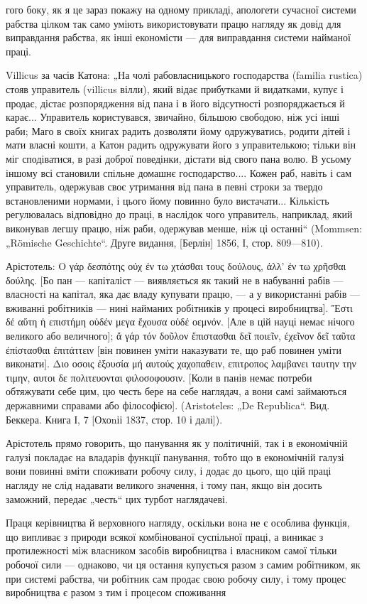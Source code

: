 гого боку, як я це зараз покажу на одному прикладі, апологети
сучасної системи рабства цілком так само уміють використовувати
працю нагляду як довід для виправдання рабства, як інші
економісти — для виправдання системи найманої праці.

Villicus за часів Катона: „На чолі рабовласницького господарства
(familia rustica) стояв управитель (villicus вілли), який відає
прибутками й видатками, купує і продає, дістає розпорядження
від пана і в його відсутності розпоряджається й карає...
Управитель користувався, звичайно, більшою свободою, ніж
усі інші раби; Маго в своїх книгах радить дозволяти йому одружуватись,
родити дітей і мати власні кошти, а Катон радить
одружувати його з управителькою; тільки він міг сподіватися,
в разі доброї поведінки, дістати від свого пана волю. В усьому
іншому всі становили спільне домашнє господарство.... Кожен
раб, навіть і сам управитель, одержував своє утримання від
пана в певні строки за твердо встановленими нормами, і цього
йому повинно було вистачати... Кількість регулювалась відповідно
до праці, в наслідок чого управитель, наприклад, який
виконував легшу працю, ніж раби, одержував менше, ніж ці
останні“ (Mommsen: „Römische Geschichte“. Друге видання, [Берлін]
1856, І, стор. 809—810).

Арістотель: Ο γάρ δεσπότης οὐχ ἐν τω  χτάσθαι τους δούλους, ἀλλ’ ἐν τω
χρῆσθαι δούλης. [Бо пан — капіталіст — виявляється як такий не в
набуванні рабів — власності на капітал, яка дає владу купувати
працю, — а у використанні рабів — вживанні робітників — нині
найманих робітників у процесі виробництва]. Ἔστι δέ αὕτη ἡ επιστήμη
οὐδέν μεγα ἔχουσα οὐδέ οεμνόν. [Але в цій науці немає нічого великого
або величного]; ἄ γάρ τόν δοῦλον ἔπιστασθαι δεῖ ποιεῖν, έχεῖνον δεῖ
ταῦτα ἐπίστασθαι ἐπιτάττειν [він повинен уміти наказувати те, що раб
повинен уміти виконати]. Διο οσοις ἐξουσία μή αυτούς χαχοπαθειν, επιτροπος
λαμβανει ταυτην την τιμην, αυτοι δε πολιτευονται φιλοσοφουσιν.
[Коли в панів немає потреби обтяжувати себе цим, цю честь
бере на себе наглядач, а вони самі займаються державними
справами або філософією]. (Aristoteles: „De Republica“. Вид.
Беккера. Книга І, 7 [Охоnіі 1837, стор. 10 і далі]).

Арістотель прямо говорить, що панування як у політичній,
так і в економічній галузі покладає на владарів функції панування,
тобто що в економічній галузі вони повинні вміти споживати
робочу силу, і додає до цього, що цій праці нагляду не слід надавати
великого значення, і тому пан, якщо він досить заможний,
передає „честь“ цих турбот наглядачеві.

Праця керівництва й верховного нагляду, оскільки вона не є
особлива функція, що випливає з природи всякої комбінованої
суспільної праці, а виникає з протилежності між власником засобів
виробництва і власником самої тільки робочої сили — однаково,
чи ця остання купується разом з самим робітником, як при
системі рабства, чи робітник сам продає свою робочу силу, і тому
процес виробництва є разом з тим і процесом споживання
